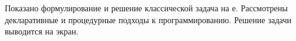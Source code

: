 
Показано формулирование и решение классической задача на \prolog е. Рассмотрены
декларативные и процедурные подходы к программированию. Решение задачи выводится
на экран.
